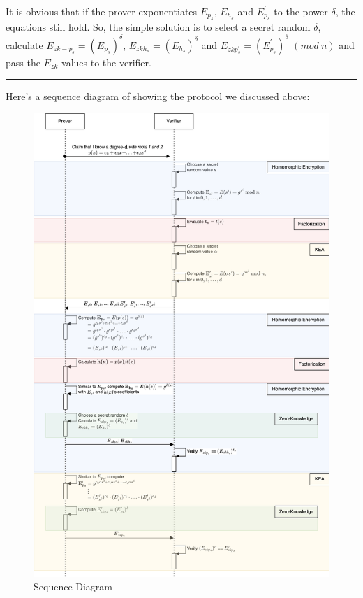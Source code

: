 \documentclass[
]{report}
\begin{document}
It is obvious that if the prover exponentiates \(E_{p_{s}}\),
\(E_{h_{s}}\) and \(E_{p_{s}}^{'}\) to the power \(\delta\), the
equations still hold. So, the simple solution is to select a secret
random \(\delta\), calculate
\(E_{zk - p_{s}} = \left( E_{p_{s}} \right)^{\delta}\),
\(E_{zkh_{s}} = \left( E_{h_{s}} \right)^{\delta}\) and
\(E_{zkp_{s}^{'}} = \left( E_{p_{s}}^{'} \right)^{\delta}\) \((mod\ n)\)
and pass the \(E_{zk}\) values to the verifier.

\begin{center}\rule{0.5\linewidth}{0.5pt}\end{center}

Here's a sequence diagram of showing the protocol we discussed
above:

\begin{figure}
\centering
\includegraphics{zksnark.png}
\caption{Sequence Diagram}
\end{figure}
\end{document}
